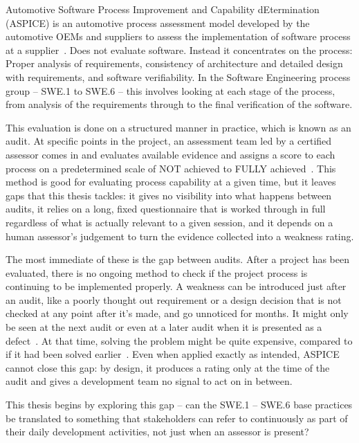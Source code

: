 \documentclass[a4paper, 12pt, oneside, openany, BCOR1cm,toc=chapterentrywithdots]{scrbook}
\begin{document}
Automotive Software Process Improvement and Capability dEtermination (ASPICE) is an automotive
process assessment model developed by the automotive OEMs and suppliers to assess the
implementation of software process at a supplier~\cite{vdaqmc2023pam}. Does not evaluate
software. Instead it concentrates on the process: Proper analysis of requirements, consistency of
architecture and detailed design with requirements, and software verifiability. In the Software
Engineering process group -- SWE.1 to SWE.6 -- this involves looking at each stage of the
process, from analysis of the requirements through to the final verification of the software.

This evaluation is done on a structured manner in practice, which is known as an audit. At
specific points in the project, an assessment team led by a certified assessor comes in and
evaluates available evidence and assigns a score to each process on a predetermined scale of NOT achieved to FULLY
achieved~\cite{vdaqmc2023pam,murphy_aspice_0to60}. This method is good for evaluating process
capability at a given time, but it leaves gaps that this thesis tackles: it gives no visibility
into what happens between audits, it relies on a long, fixed questionnaire that is worked through
in full regardless of what is actually relevant to a given session, and it depends on a human
assessor's judgement to turn the evidence collected into a weakness rating.

The most immediate of these is the gap between audits. After a project has been evaluated, there is no
ongoing method to check if the project process is continuing to be implemented properly. A
weakness can be introduced just after an audit, like a poorly thought out requirement or a design
decision that is not checked at any point after it's made, and go unnoticed for months. It might
only be seen at the next audit or even at a later audit when it is presented as a
defect~\cite{datsogiannis2024early}. At that time, solving the problem might be quite expensive,
compared to if it had been solved earlier~\cite{schauffele2016automotive,jiang2013earlylifecycle}.
Even when applied exactly as intended, ASPICE cannot close this gap: by design, it produces a
rating only at the time of the audit and gives a development team no signal to act on in
between.

This thesis begins by exploring this gap -- can the SWE.1 -- SWE.6 base practices be translated to
something that stakeholders can refer to continuously as part of their daily development
activities, not just when an assessor is present?
\end{document}
